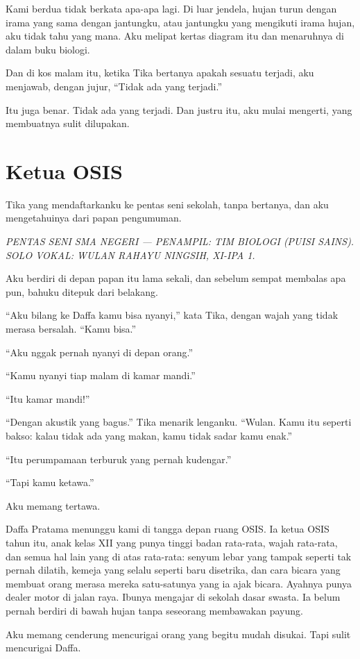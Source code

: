 \documentclass[11pt,twoside,openany]{book}
\begin{document}
Kami berdua tidak berkata apa-apa lagi. Di luar jendela, hujan turun dengan irama yang sama dengan jantungku, atau jantungku yang mengikuti irama hujan, aku tidak tahu yang mana. Aku melipat kertas diagram itu dan menaruhnya di dalam buku biologi.

Dan di kos malam itu, ketika Tika bertanya apakah sesuatu terjadi, aku menjawab, dengan jujur, ``Tidak ada yang terjadi.''

Itu juga benar. Tidak ada yang terjadi. Dan justru itu, aku mulai mengerti, yang membuatnya sulit dilupakan.

\chapter{Ketua OSIS}
Tika yang mendaftarkanku ke pentas seni sekolah, tanpa bertanya, dan aku mengetahuinya dari papan pengumuman.

\emph{PENTAS SENI SMA NEGERI --- PENAMPIL: TIM BIOLOGI (PUISI SAINS). SOLO VOKAL: WULAN RAHAYU NINGSIH, XI-IPA 1.}

Aku berdiri di depan papan itu lama sekali, dan sebelum sempat membalas apa pun, bahuku ditepuk dari belakang.

``Aku bilang ke Daffa kamu bisa nyanyi,'' kata Tika, dengan wajah yang tidak merasa bersalah. ``Kamu bisa.''

``Aku nggak pernah nyanyi di depan orang.''

``Kamu nyanyi tiap malam di kamar mandi.''

``Itu kamar mandi!''

``Dengan akustik yang bagus.'' Tika menarik lenganku. ``Wulan. Kamu itu seperti bakso: kalau tidak ada yang makan, kamu tidak sadar kamu enak.''

``Itu perumpamaan terburuk yang pernah kudengar.''

``Tapi kamu ketawa.''

Aku memang tertawa.

Daffa Pratama menunggu kami di tangga depan ruang OSIS. Ia ketua OSIS tahun itu, anak kelas XII yang punya tinggi badan rata-rata, wajah rata-rata, dan semua hal lain yang di atas rata-rata: senyum lebar yang tampak seperti tak pernah dilatih, kemeja yang selalu seperti baru disetrika, dan cara bicara yang membuat orang merasa mereka satu-satunya yang ia ajak bicara. Ayahnya punya dealer motor di jalan raya. Ibunya mengajar di sekolah dasar swasta. Ia belum pernah berdiri di bawah hujan tanpa seseorang membawakan payung.

Aku memang cenderung mencurigai orang yang begitu mudah disukai. Tapi sulit mencurigai Daffa.
\end{document}
